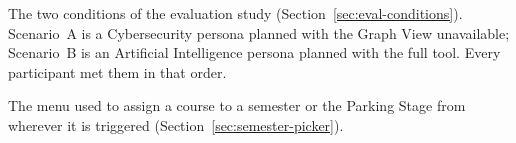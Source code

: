 \begin{description}
  \label{gls:scenario-a}
  \item[Scenario A / Scenario B] The two conditions of the evaluation study (Section~\ref{sec:eval-conditions}). Scenario~A is a Cybersecurity persona planned with the Graph View unavailable; Scenario~B is an Artificial Intelligence persona planned with the full tool. Every participant met them in that order.
  \label{gls:semester-picker}
  \item[Semester Picker] The menu used to assign a course to a semester or the Parking Stage from wherever it is triggered (Section~\ref{sec:semester-picker}).
\end{description}
